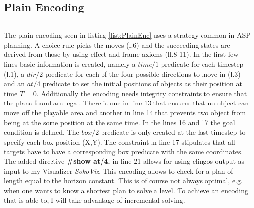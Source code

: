 \documentclass[12pt,a4paper,oneside]{report}
\begin{document}
\subsection{Plain Encoding}

\begin{lstlisting}[caption={Plain Encoding},label=list:PlainEnc]
\end{lstlisting}
The plain encoding seen in listing \ref{list:PlainEnc} uses a strategy common in ASP planning. A choice rule picks the moves (l.6) and the succeeding states are derived from those by using effect and frame axioms (ll.8-11).
In the first few lines basic information is created, namely a $time/1$ predicate for each timestep (l.1), a $dir/2$ predicate for each of the four possible directions to move in (l.3) and an $at/4$ predicate to set the initial positions of objects as their position at time $T=0$.
Additionally the encoding needs integrity constraints to ensure that the plans found are legal. There is one in line 13 that ensures that no object can move off the playable area and another in line 14 that prevents two object from being at the some position at the same time.
In the lines 16 and 17 the goal condition is defined. The $box/2$ predicate is only created at the last timestep to specify each box position (X,Y). The constraint in line 17 stipulates that all targets have to have a corresponding box predicate with the same coordinates.
The added directive \textbf{\#show at/4.} in line 21 allows for using clingos output as input to my Visualizer \textit{SokoViz}.
This encoding allows to check for a plan of length equal to the horizon constant. This is of course not always optimal, e.g. when one wants to know a shortest plan to solve a level. To achieve an encoding that is able to, I will take advantage of incremental solving.
\\
\end{document}
